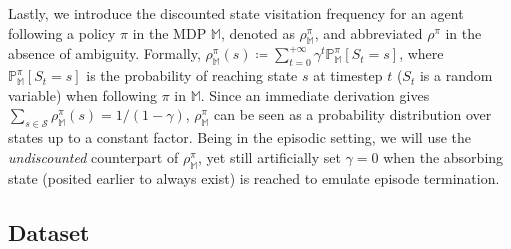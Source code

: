Lastly, we introduce the discounted state visitation frequency for an agent following
a policy $\pi$
in the MDP $\mathbb{M}$, denoted as $\rho^\pi_\mathbb{M}$,
and abbreviated $\rho^\pi$ in the absence of ambiguity.
Formally,
$\rho^\pi_\mathbb{M} (s)
\coloneqq
\sum_{t=0}^{+\infty} \gamma^t \mathbb{P}^\pi_\mathbb{M} [S_t=s]$,
where $\mathbb{P}^\pi_\mathbb{M} [S_t=s]$ is the probability of reaching state $s$
at timestep $t$ ($S_t$ is a random variable) when following $\pi$ in $\mathbb{M}$.
Since an immediate derivation gives $\sum_{s \in \mathcal{S}} \rho^\pi_\mathbb{M}(s) = 1 / (1-\gamma)$,
$\rho^\pi_\mathbb{M}$ can be seen as a probability distribution over states up to a constant factor.
Being in the episodic setting, we will use the \emph{undiscounted} counterpart of $\rho^\pi_\mathbb{M}$,
yet still artificially set $\gamma=0$ when the absorbing state (posited earlier to always exist)
is reached to emulate episode termination.

\subsection*{Dataset}

